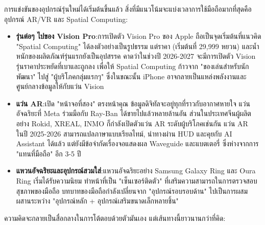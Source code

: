 


การแข่งขันของอุปกรณ์รุ่นใหม่ได้เริ่มต้นขึ้นแล้ว สิ่งที่มีแนวโน้มจะแบ่งเวลาการใช้มือถือมากที่สุดคืออุปกรณ์ AR/VR และ Spatial Computing:

\begin{itemize}
  \item \textbf{รุ่นต่อๆ ไปของ Vision Pro}:การเปิดตัว Vision Pro ของ Apple ถือเป็นจุดเริ่มต้นที่แนวคิด "Spatial Computing" ได้ลงตัวอย่างเป็นรูปธรรม แต่ราคา (เริ่มต้นที่ 29,999 หยวน) และน้ำหนักของผลิตภัณฑ์รุ่นแรกยังเป็นอุปสรรค คาดว่าในช่วงปี 2026-2027 จะมีการเปิดตัว Vision รุ่นราคาประหยัดที่เบาและถูกลง เพื่อให้ Spatial Computing ก้าวจาก "ของเล่นสำหรับนักพัฒนา" ไปสู่ "ผู้บริโภคกลุ่มแรกๆ" ซึ่งในขณะนั้น iPhone อาจกลายเป็นแหล่งพลังงานและศูนย์กลางข้อมูลให้กับแว่น Vision
  \item \textbf{แว่น AR}:เปิด "หน้าจอที่สอง" ตรงหน้าคุณ ข้อมูลดิจิทัลจะอยู่ทุกที่ราวกับอากาศหายใจ แว่นอัจฉริยะที่ Meta ร่วมมือกับ Ray-Ban ได้ขายไปแล้วหลายล้านอัน ส่วนในประเทศจีนผู้ผลิตอย่าง Rokid, XREAL, INMO ก็กำลังเปิดตัวแว่น AR ระดับผู้บริโภคเช่นกัน แว่น AR ในปี 2025-2026 สามารถแปลภาษาแบบเรียลไทม์, นำทางผ่าน HUD และคุยกับ AI Assistant ได้แล้ว แต่ยังมีข้อจำกัดเรื่องจอแสดงผล Waveguide และแบตเตอรี่ ซึ่งห่างจากการ "แทนที่มือถือ" อีก 3-5 ปี
  \item \textbf{แหวนอัจฉริยะและอุปกรณ์สวมใส่}:แหวนอัจฉริยะอย่าง Samsung Galaxy Ring และ Oura Ring เริ่มได้รับความนิยม ทำหน้าที่เป็น "เซ็นเซอร์ติดตัว" ที่เสริมความสามารถในการตรวจสอบสุขภาพของมือถือ บทบาทของมือถือกำลังเปลี่ยนจาก "อุปกรณ์รอบรอบด้าน" ไปเป็นการผสมผสานระหว่าง "อุปกรณ์หลัก + อุปกรณ์เสริมขนาดเล็กหลายชิ้น"
\end{itemize}


ความคิดจะกลายเป็นสื่อกลางในการโต้ตอบด้วยตัวมันเอง แต่เส้นทางนี้ยาวนานกว่าที่คิด:

